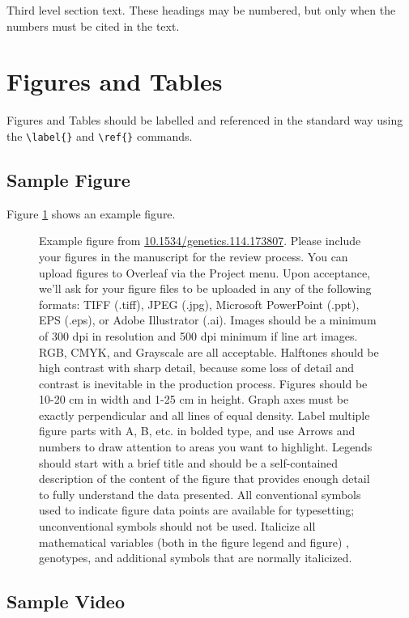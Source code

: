 \documentclass[9pt,twocolumn,twoside]{gsajnl}
\begin{document}
Third level section text. These headings may be numbered, but only when the numbers must be cited in the text. 

\section*{Figures and Tables}

Figures and Tables should be labelled and referenced in the standard way using the \verb|\label{}| and \verb|\ref{}| commands.

\subsection*{Sample Figure}

Figure \ref{fig:spectrum} shows an example figure.

\begin{figure}[htbp]
\centering
\caption{Example figure from \url{10.1534/genetics.114.173807}. Please include your figures in the manuscript for the review process. You can upload figures to Overleaf via the Project menu. Upon acceptance, we'll ask for your figure files to be uploaded in any of the following formats: TIFF (.tiff), JPEG (.jpg), Microsoft PowerPoint (.ppt), EPS (.eps), or Adobe Illustrator (.ai).  Images should be a minimum of 300 dpi in resolution and 500 dpi minimum if line art images.  RGB, CMYK, and Grayscale are all acceptable. Halftones should be high contrast with sharp detail, because some loss of detail and contrast is inevitable in the production process. Figures should be 10-20 cm in width and 1-25 cm in height. Graph axes must be exactly perpendicular and all lines of equal density.
Label multiple figure parts with A, B, etc. in bolded type, and use Arrows and numbers to draw attention to areas you want to highlight. Legends should start with a brief title and should be a self-contained description of the content of the figure that provides enough detail to fully understand the data presented. All conventional symbols used to indicate figure data points are available for typesetting; unconventional symbols should not be used. Italicize all mathematical variables (both in the figure legend and figure) , genotypes, and additional symbols that are normally italicized.  
}%
\label{fig:spectrum}
\end{figure}

\subsection*{Sample Video}
\end{document}
